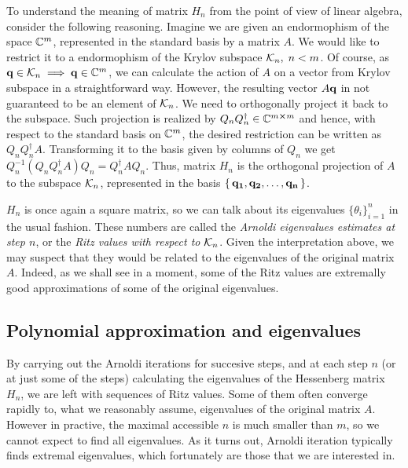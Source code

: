 To understand the meaning
of matrix \(H_n\) from the point of view of linear algebra, consider the following reasoning. Imagine we are
given an endormophism of the space \(\mathbb{C}^m\), represented in the standard basis by a matrix \(A\).
We would like to restrict it to a endormophism of the Krylov subspace \(\mathcal{K}_{n},\; n < m\). Of course,
as \(\vectorbold{q} \in \K{n} \implies \vectorbold{q} \in \CC^m\), we can calculate the action of \(A\) on a vector
from Krylov subspace in a straightforward way. However, the resulting vector \(A\vectorbold{q}\) in not guaranteed
to be an element of \(\mathcal{K}_{n}\). We need to orthogonally project it back to the subspace. Such projection
is realized by \(Q_n Q^{\dagger}_n \in \mathbb{C}^{m\cross m}\) and hence, with respect to the standard basis on \(\mathbb{C}^m\),
the desired restriction can be written as \(Q_n Q^{\dagger}_n A\). Transforming it to the basis given by columns of
\(Q_n\) we get \( Q_n^{-1}\left(Q_n Q^{\dagger}_n A\right)Q_n = Q^{\dagger}_n A Q_n\). Thus, matrix \(H_n\)
is the orthogonal projection of \(A\) to the subspace \(\mathcal{K}_{n}\), represented in the basis
\(\{\,\vectorbold{q_1},\vectorbold{q_2},\ldots,\vectorbold{q_n}\,\}\).

\(H_n\) is once again a square matrix, so we can talk about its eigenvalues \(\{\theta_i\}_{i = 1}^n\)
in the usual fashion. These numbers are called the \textit{Arnoldi eigenvalues estimates at step \(n\)}, or
the \textit{Ritz values with respect to \(\mathcal{K}_{n}\)}.
Given the interpretation above, we may suspect that they would be related to the eigenvalues of the original matrix \(A\).
Indeed, as we shall see in a moment, some of the Ritz values are extremally good approximations of some of the
original eigenvalues.


\subsection{Polynomial approximation and eigenvalues}

By carrying out the Arnoldi iterations for succesive steps, and at each step \(n\) (or at just some of the steps)
calculating the eigenvalues of the Hessenberg matrix \(H_n\), we are left with sequences of Ritz values. Some
of them often converge rapidly to, what we reasonably assume, eigenvalues of the original matrix \(A\).
However in practive, the maximal accessible \(n\) is much smaller than \(m\), so we cannot expect to find
all eigenvalues. As it turns out, Arnoldi iteration typically finds extremal eigenvalues, which fortunately
are those that we are interested in.

